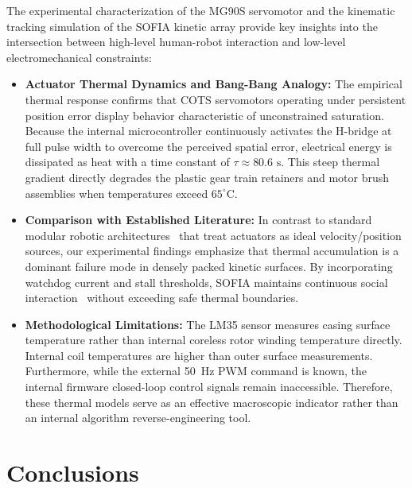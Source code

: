 \documentclass[lettersize,journal]{IEEEtran}
\begin{document}
The experimental characterization of the MG90S servomotor and the kinematic tracking simulation of the SOFIA kinetic array provide key insights into the intersection between high-level human-robot interaction and low-level electromechanical constraints:
\begin{itemize}
\item \textbf{Actuator Thermal Dynamics and Bang-Bang Analogy:} The empirical thermal response confirms that COTS servomotors operating under persistent position error display behavior characteristic of unconstrained saturation. Because the internal microcontroller continuously activates the H-bridge at full pulse width to overcome the perceived spatial error, electrical energy is dissipated as heat with a time constant of $\tau \approx 80.6\text{ s}$. This steep thermal gradient directly degrades the plastic gear train retainers and motor brush assemblies when temperatures exceed $65^\circ\text{C}$.
\item \textbf{Comparison with Established Literature:} In contrast to standard modular robotic architectures~\cite{seo2019modular} that treat actuators as ideal velocity/position sources, our experimental findings emphasize that thermal accumulation is a dominant failure mode in densely packed kinetic surfaces. By incorporating watchdog current and stall thresholds, SOFIA maintains continuous social interaction~\cite{fong2003social} without exceeding safe thermal boundaries.
\item \textbf{Methodological Limitations:} The LM35 sensor measures casing surface temperature rather than internal coreless rotor winding temperature directly. Internal coil temperatures are higher than outer surface measurements. Furthermore, while the external 50~Hz PWM command is known, the internal firmware closed-loop control signals remain inaccessible. Therefore, these thermal models serve as an effective macroscopic indicator rather than an internal algorithm reverse-engineering tool.
\end{itemize}

\section{Conclusions}
\label{sec:conclusions}
\end{document}
